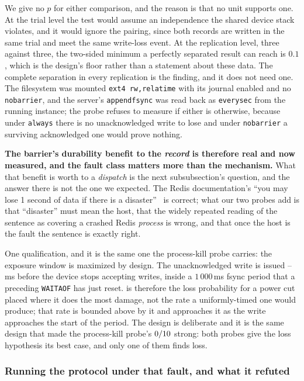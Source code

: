 We give no $p$ for either comparison, and the reason is that no unit supports
one. At the trial level the test would assume an independence the shared
device stack violates, and it would ignore the pairing, since both records are
written in the same trial and meet the same write-loss event. At the
replication level, three against three, the two-sided minimum a perfectly
separated result can reach is $0.1$, which is the design's floor rather than a
statement about these data. The complete separation in every replication is the finding, and it
does not need one. The filesystem was mounted
\texttt{ext4 rw,relatime} with its journal enabled and no \texttt{nobarrier},
and the server's \texttt{appendfsync} was read back as \texttt{everysec} from
the running instance; the probe refuses to measure if either is otherwise,
because under \texttt{always} there is no unacknowledged write to lose and
under \texttt{nobarrier} a surviving acknowledged one would prove nothing.

\textbf{The barrier's durability benefit to the \emph{record} is therefore real
and now measured, and the fault class matters more than the mechanism.} What
that benefit is worth to a \emph{dispatch} is the next subsubsection's question,
and the answer there is not the one we expected. The Redis documentation's
``you may lose 1 second of data if there is a disaster''~\cite{redis-persistence}
is correct; what our two probes add is that ``disaster'' must mean the host,
that the widely repeated reading of the sentence as covering a crashed Redis
\emph{process} is wrong, and that once the host is the fault the sentence is
exactly right.

One qualification, and it is the same one the process-kill probe carries: the
exposure window is maximized by design. The unacknowledged write is issued
\FlakeyWindowMin{}--\FlakeyWindowMax{}\,ms before the device stops accepting
writes, inside a $1\,000$\,ms fsync period that a preceding \texttt{WAITAOF}
has just reset. \FlakeyUnackLost{} is therefore the loss probability for a
power cut placed where it does the most damage, not the rate a uniformly-timed
one would produce; that rate is bounded above by it and approaches it as the
write approaches the start of the period. The design is deliberate and it is
the same design that made the process-kill probe's $0/10{}$
strong: both probes
give the loss hypothesis its best case, and only one of them finds loss.

\subsubsection{Running the protocol under that fault, and what it refuted}
\label{sec:eval-writeloss-cell}

